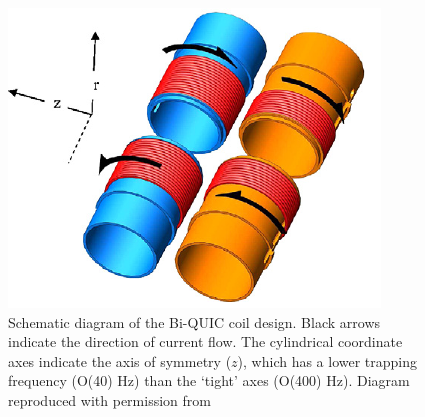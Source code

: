 	\begin{figure}
	\begin{minipage}{0.55\textwidth} %
	\vspace{0pt}
		\includegraphics[width=\textwidth]{fig/apparatus/biquic_coil.pdf}

	\end{minipage}
	\hfill
	\begin{minipage}{0.45\textwidth}
	\vspace{0pt}
	\caption{Schematic diagram of the Bi-QUIC coil design. Black arrows indicate the direction of current flow. The cylindrical coordinate axes indicate the axis of symmetry ($z$), which has a lower trapping frequency (O(40) Hz) than the `tight' axes (O(400) Hz). Diagram reproduced with permission from \cite{Dall07}}
	\end{minipage}
	\end{figure}

